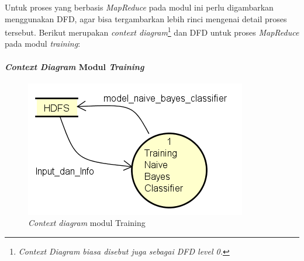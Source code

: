 Untuk proses yang berbasis \textit{MapReduce} pada modul ini perlu digambarkan menggunakan DFD, agar bisa tergambarkan lebih rinci mengenai detail proses tersebut. Berikut merupakan \textit{context diagram}\footnote{\textit{Context Diagram biasa disebut juga sebagai DFD level 0.}} dan DFD untuk proses \textit{MapReduce} pada modul \textit{training}:

\paragraph{\textit{Context Diagram} Modul \textit{Training}}
\label{par:contextdiagramTraining}

\begin{figure}[H]
	\label{DFD_0_Training}
	\centering
	\includegraphics[scale=0.65]{Diagram/DFD_0_Training}
	\caption[\textit{Context diagram} modul Training]{\textit{Context diagram} modul Training}
	\label{fig:Context diagram modul Training}
\end{figure}

